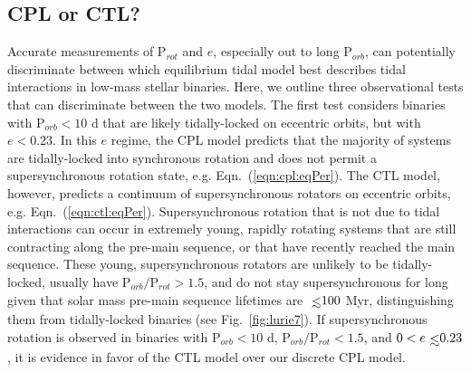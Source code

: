\documentclass[twocolumn]{aastex61}
\def\lsim{~\rlap{$<$}{\lower 1.0ex\hbox{$\sim$}}}
\begin{document}


\subsection{CPL or CTL?} \label{sec:whichModel}

Accurate measurements of P$_{rot}$ and $e$, especially out to long P$_{orb}$, can potentially discriminate between which equilibrium tidal model best describes tidal interactions in low-mass stellar binaries. Here, we outline three observational tests that can discriminate between the two models. The first test considers binaries with P$_{orb} < 10$ d that are likely tidally-locked on eccentric orbits, but with $e < 0.23$.  In this $e$ regime, the CPL model predicts that the majority of systems are tidally-locked into synchronous rotation and does not permit a supersynchronous rotation state, e.g. Eqn.~(\ref{eqn:cpl:eqPer}). The CTL model, however, predicts a continuum of supersynchronous rotators on eccentric orbits, e.g. Eqn.~(\ref{eqn:ctl:eqPer}). Supersynchronous rotation that is not due to tidal interactions can occur in extremely young, rapidly rotating systems that are still contracting along the pre-main sequence, or that have recently reached the main sequence.  These young, supersynchronous rotators are unlikely to be tidally-locked, usually have P$_{orb}/$P$_{rot} > 1.5$, and do not stay supersynchronous for long given that solar mass pre-main sequence lifetimes are $\lsim 100$ Myr, distinguishing them from tidally-locked binaries (see Fig.~\ref{fig:lurie7}).   If supersynchronous rotation is observed in binaries with P$_{orb} < 10$ d, P$_{orb}/$P$_{rot} < 1.5$, and $0 < e \lsim 0.23$, it is evidence in favor of the CTL model over our discrete CPL model. 
\end{document}
